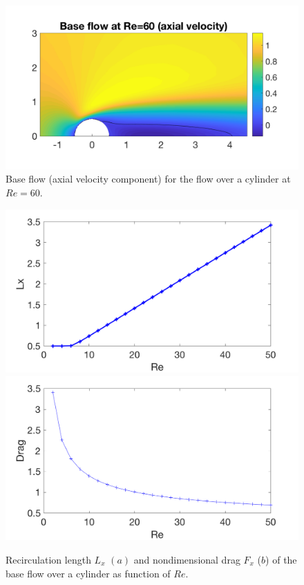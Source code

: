 \documentclass[twocolumn,10pt]{asme2ej}
\begin{document}
\begin{figure}
\includegraphics[width=.9 \linewidth]{Cylinder_BaseFlowRe60.png}
\caption{Base flow (axial velocity component) for the flow over a cylinder at $Re=60$.}
\label{fig:Baseflow}
\end{figure}

\begin{figure}
\includegraphics[width=.9 \linewidth]{Cylinder_Lx_baseflow.png}
\includegraphics[width=.9 \linewidth]{Cylinder_Drag_baseflow.png}
\caption{Recirculation length $L_x$ $(a)$  and nondimensional drag $F_x$ ($b$) of the base flow over a cylinder as function of $Re$.}
\label{fig:LxandDrag}
\end{figure}
\end{document}
